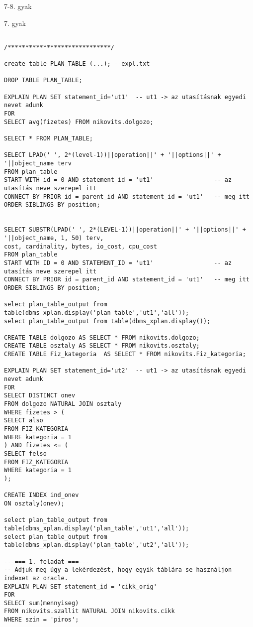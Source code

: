 \documentclass[a4paper,11.5pt, table]{article}
\begin{document}
	\begin{center}
		{\LARGE 7-8. gyak}
		\smallskip
		
		{\large 7. gyak}
	\end{center}
\begin{lstlisting}

/*****************************/

create table PLAN_TABLE (...); --expl.txt

DROP TABLE PLAN_TABLE;

EXPLAIN PLAN SET statement_id='ut1'  -- ut1 -> az utasításnak egyedi nevet adunk
FOR 
SELECT avg(fizetes) FROM nikovits.dolgozo;

SELECT * FROM PLAN_TABLE;

SELECT LPAD(' ', 2*(level-1))||operation||' + '||options||' + '||object_name terv
FROM plan_table
START WITH id = 0 AND statement_id = 'ut1'                 -- az utasítás neve szerepel itt
CONNECT BY PRIOR id = parent_id AND statement_id = 'ut1'   -- meg itt
ORDER SIBLINGS BY position;


SELECT SUBSTR(LPAD(' ', 2*(LEVEL-1))||operation||' + '||options||' + '||object_name, 1, 50) terv,
cost, cardinality, bytes, io_cost, cpu_cost
FROM plan_table
START WITH ID = 0 AND STATEMENT_ID = 'ut1'                 -- az utasítás neve szerepel itt
CONNECT BY PRIOR id = parent_id AND statement_id = 'ut1'   -- meg itt
ORDER SIBLINGS BY position;

select plan_table_output from table(dbms_xplan.display('plan_table','ut1','all'));
select plan_table_output from table(dbms_xplan.display());

CREATE TABLE dolgozo AS SELECT * FROM nikovits.dolgozo;
CREATE TABLE osztaly AS SELECT * FROM nikovits.osztaly;
CREATE TABLE Fiz_kategoria  AS SELECT * FROM nikovits.Fiz_kategoria;

EXPLAIN PLAN SET statement_id='ut2'  -- ut1 -> az utasításnak egyedi nevet adunk
FOR 
SELECT DISTINCT onev
FROM dolgozo NATURAL JOIN osztaly
WHERE fizetes > (
SELECT also
FROM FIZ_KATEGORIA
WHERE kategoria = 1
) AND fizetes <= (
SELECT felso
FROM FIZ_KATEGORIA
WHERE kategoria = 1
);

CREATE INDEX ind_onev
ON osztaly(onev);

select plan_table_output from table(dbms_xplan.display('plan_table','ut1','all'));
select plan_table_output from table(dbms_xplan.display('plan_table','ut2','all'));

---=== 1. feladat ===---
-- Adjuk meg úgy a lekérdezést, hogy egyik táblára se használjon indexet az oracle. 
EXPLAIN PLAN SET statement_id = 'cikk_orig'
FOR
SELECT sum(mennyiseg)
FROM nikovits.szallit NATURAL JOIN nikovits.cikk
WHERE szin = 'piros';


\end{lstlisting}
\end{document}
